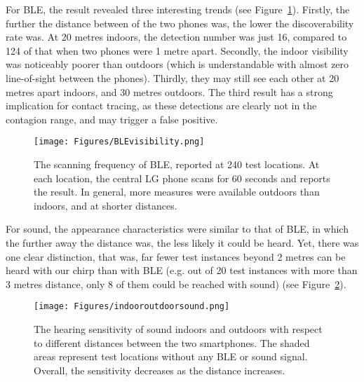 \documentclass[graybox]{svmult}
\begin{document}
For BLE, the result revealed three interesting trends (see Figure~\ref{BLEvisibility}). Firstly, the further the distance between of the two phones was, the lower the discoverability rate was. At 20 metres indoors, the detection number was just 16, compared to 124 of that when two phones were 1 metre apart. Secondly, the indoor visibility was noticeably poorer than outdoors (which is understandable with almost zero line-of-sight between the phones). Thirdly, they may still see each other at 20 metres apart indoors, and 30 metres outdoors. The third result has a strong implication for contact tracing, as these detections are clearly not in the contagion range, and may trigger a false positive.
\begin{figure}[h]
    \centering
    \sidecaption
    \texttt{[image: Figures/BLEvisibility.png]}
    \caption{The scanning frequency of BLE, reported at 240 test locations. At each location, the central LG phone scans for 60 seconds and reports the result. In general, more measures were available outdoors than indoors, and at shorter distances.}
    \label{BLEvisibility}       
\end{figure}

For sound, the appearance characteristics were similar to that of BLE, in which the further away the distance was, the less likely it could be heard. Yet, there was one clear distinction, that was, far fewer test instances beyond 2 metres can be heard with our chirp than with BLE (e.g. out of 20 test instances with more than 3 metres distance, only 8 of them could be reached with sound) (see Figure~\ref{indooroutdoorsound}).
\begin{figure}[h]
    \centering
    \sidecaption
    \texttt{[image: Figures/indooroutdoorsound.png]}
    \caption{The hearing sensitivity of sound indoors and outdoors with respect to different distances between the two smartphones. The shaded areas represent test locations without any BLE or sound signal. Overall, the sensitivity decreases as the distance increases.}
    \label{indooroutdoorsound}       
\end{figure}
\end{document}
